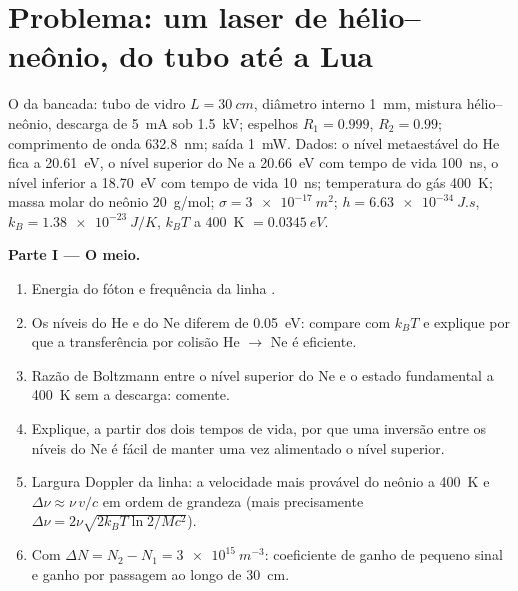 \section{Problema: um laser de hélio--neônio, do tubo até a Lua}

\begin{problem}\label{pb:b2:laser:1}
O  da bancada: tubo de vidro $L = \qty{30}{cm}$, diâmetro interno
\qty{1}{mm}, mistura hélio--neônio, descarga de \qty{5}{mA} sob
\qty{1.5}{kV}; espelhos $R_1 = 0.999$, $R_2 = 0.99$; comprimento de onda
\qty{632.8}{nm}; saída \qty{1}{mW}. Dados: o nível metaestável do He fica
a \qty{20.61}{eV}, o nível  superior do Ne a \qty{20.66}{eV} com
tempo de vida \qty{100}{ns}, o nível  inferior a \qty{18.70}{eV} com
tempo de vida \qty{10}{ns}; temperatura do gás \qty{400}{K}; massa molar do neônio
\qty{20}{g/mol};  $\sigma = \qty{3e-17}{m^2}$; $h =
\qty{6.63e-34}{J.s}$, $k_B = \qty{1.38e-23}{J/K}$, $k_BT$ a \qty{400}{K}
$= \qty{0.0345}{eV}$.

\textbf{Parte I --- O meio.}
\begin{enumerate}
  \item Energia do fóton e frequência da linha .
  \item Os níveis do He e do Ne diferem de \qty{0.05}{eV}: compare com
        $k_BT$ e explique por que a transferência por colisão He $\to$ Ne é
        eficiente.
  \item Razão de Boltzmann entre o nível superior do Ne e o estado fundamental a
        \qty{400}{K} sem a descarga: comente.
  \item Explique, a partir dos dois tempos de vida, por que uma inversão entre os
        níveis do Ne é fácil de manter uma vez alimentado o nível superior.
  \item Largura Doppler da linha: a velocidade mais provável do neônio a
        \qty{400}{K} e $\Delta\nu \approx \nu\,v/c$ em ordem de
        grandeza (mais precisamente $\Delta\nu = 2\nu\sqrt{2k_BT\ln2/Mc^2}$).
  \item Com $\Delta N = N_2 - N_1 = \qty{3e15}{m^{-3}}$: coeficiente de ganho
        de pequeno sinal e ganho por passagem ao longo de \qty{30}{cm}.
\end{enumerate}


\end{problem}
